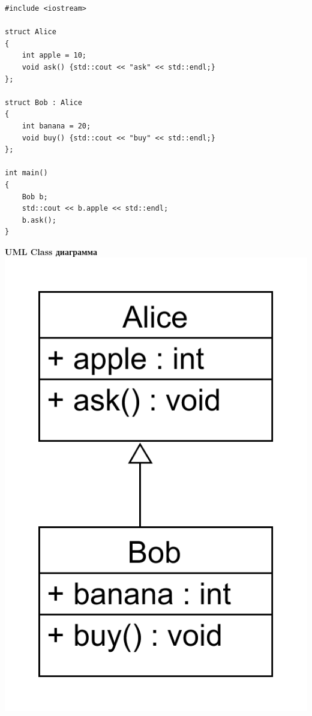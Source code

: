 \documentclass{article}
\begin{document}
\begin{minipage}{0.62\textwidth}
\begin{lstlisting}
#include <iostream>

struct Alice
{
    int apple = 10;
    void ask() {std::cout << "ask" << std::endl;}
};

struct Bob : Alice
{
    int banana = 20;
    void buy() {std::cout << "buy" << std::endl;}
};

int main()
{
    Bob b;
    std::cout << b.apple << std::endl; 
    b.ask();
}
\end{lstlisting}
\end{minipage}
\begin{minipage}{0.37\textwidth}
\begin{center}
\textbf{UML Class диаграмма}
\includegraphics[scale=0.18]{../images/alice_bob.png}
\end{center}
\end{minipage}
\end{document}
